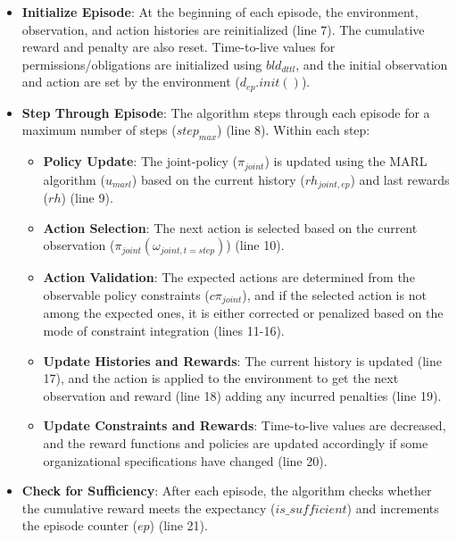 \documentclass[runningheads]{llncs}
\theoremstyle{freethm}
\theoremstyle{proofoutline}
\begin{document}
\begin{itemize}
    \item \textbf{Initialize Episode}:
          At the beginning of each episode, the environment, observation, and action histories are reinitialized (line 7). The cumulative reward and penalty are also reset. Time-to-live values for permissions/obligations are initialized using $bld_{dttl}$, and the initial observation and action are set by the environment ($d_{ep}.init()$).

    \item \textbf{Step Through Episode}:
          The algorithm steps through each episode for a maximum number of steps ($step_{max}$) (line 8). Within each step:

          \begin{itemize}
              \item \textbf{Policy Update}:
                    The joint-policy ($\pi_{joint}$) is updated using the MARL algorithm ($u_{marl}$) based on the current history ($rh_{joint,ep}$) and last rewards ($rh$) (line 9).

              \item \textbf{Action Selection}:
                    The next action is selected based on the current observation ($\pi_{joint}(\omega_{joint,t=step})$) (line 10).

              \item \textbf{Action Validation}:
                    The expected actions are determined from the observable policy constraints ($c\pi_{joint}$), and if the selected action is not among the expected ones, it is either corrected or penalized based on the mode of constraint integration (lines 11-16).

              \item \textbf{Update Histories and Rewards}:
                    The current history is updated (line 17), and the action is applied to the environment to get the next observation and reward (line 18) adding any incurred penalties (line 19).

              \item \textbf{Update Constraints and Rewards}:
                    Time-to-live values are decreased, and the reward functions and policies are updated accordingly if some organizational specifications have changed (line 20).
          \end{itemize}

    \item \textbf{Check for Sufficiency}:
          After each episode, the algorithm checks whether the cumulative reward meets the expectancy ($is\_sufficient$) and increments the episode counter ($ep$) (line 21).
\end{itemize}
\end{document}
